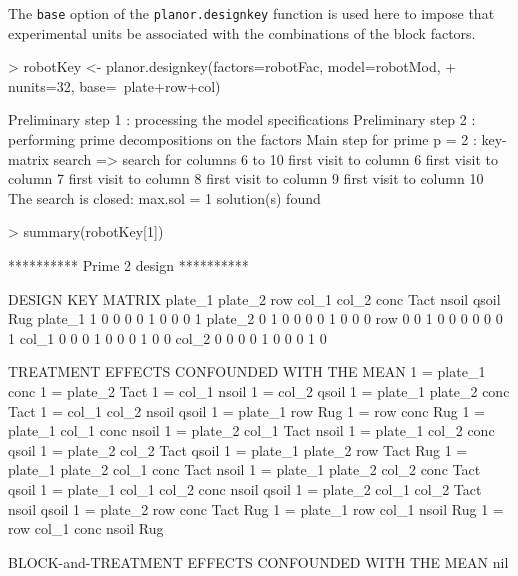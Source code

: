 \documentclass[a4paper]{article}
\begin{document}
The \texttt{base} option of the \texttt{planor.designkey} function is
used here to impose that experimental units be associated with the
combinations of the block factors.
\begin{Schunk}
\begin{Sinput}
> robotKey <- planor.designkey(factors=robotFac, model=robotMod,
+                              nunits=32, base=~plate+row+col)
\end{Sinput}
\begin{Soutput}
Preliminary step 1 : processing the model specifications
Preliminary step 2 : performing prime decompositions on the factors
Main step for prime p = 2 : key-matrix search
  => search for columns 6 to 10 
      first visit to column 6 
      first visit to column 7 
      first visit to column 8 
      first visit to column 9 
      first visit to column 10 
The search is closed: max.sol =  1 solution(s) found 
\end{Soutput}
\begin{Sinput}
> summary(robotKey[1])
\end{Sinput}
\begin{Soutput}
********** Prime  2  design **********

DESIGN KEY MATRIX
        plate_1 plate_2 row col_1 col_2 conc Tact nsoil qsoil Rug
plate_1       1       0   0     0     0    1    0     0     0   1
plate_2       0       1   0     0     0    0    1     0     0   0
row           0       0   1     0     0    0    0     0     0   1
col_1         0       0   0     1     0    0    0     1     0   0
col_2         0       0   0     0     1    0    0     0     1   0

TREATMENT EFFECTS CONFOUNDED WITH THE MEAN
1 = plate_1 conc
1 = plate_2 Tact
1 = col_1 nsoil
1 = col_2 qsoil
1 = plate_1 plate_2 conc Tact
1 = col_1 col_2 nsoil qsoil
1 = plate_1 row Rug
1 = row conc Rug
1 = plate_1 col_1 conc nsoil
1 = plate_2 col_1 Tact nsoil
1 = plate_1 col_2 conc qsoil
1 = plate_2 col_2 Tact qsoil
1 = plate_1 plate_2 row Tact Rug
1 = plate_1 plate_2 col_1 conc Tact nsoil
1 = plate_1 plate_2 col_2 conc Tact qsoil
1 = plate_1 col_1 col_2 conc nsoil qsoil
1 = plate_2 col_1 col_2 Tact nsoil qsoil
1 = plate_2 row conc Tact Rug
1 = plate_1 row col_1 nsoil Rug
1 = row col_1 conc nsoil Rug

BLOCK-and-TREATMENT EFFECTS CONFOUNDED WITH THE MEAN
nil


\end{Soutput}
\end{Schunk}
\end{document}
